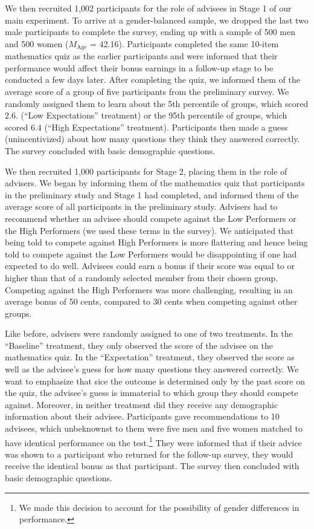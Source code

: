 \documentclass[
  man,
  floatsintext,
  longtable,
  nolmodern,
  notxfonts,
  notimes,
  colorlinks=true,linkcolor=blue,citecolor=blue,urlcolor=blue]{apa7}
\begin{document}
We then recruited 1,002 participants for the role of advisees in Stage 1
of our main experiment. To arrive at a gender-balanced sample, we
dropped the last two male participants to complete the survey, ending up
with a sample of 500 men and 500 women (\(M_{\text{Age}}\) = 42.16).
Participants completed the same 10-item mathematics quiz as the earlier
participants and were informed that their performance would affect their
bonus earnings in a follow-up stage to be conducted a few days later.
After completing the quiz, we informed them of the average score of a
group of five participants from the preliminary survey. We randomly
assigned them to learn about the 5th percentile of groups, which scored
2.6. (``Low Expectations'' treatment) or the 95th percentile of groups,
which scored 6.4 (``High Expectations'' treatment). Participants then
made a guess (unincentivized) about how many questions they think they
answered correctly. The survey concluded with basic demographic
questions.

We then recruited 1,000 participants for Stage 2, placing them in the
role of advisers. We began by informing them of the mathematics quiz
that participants in the preliminary study and Stage 1 had completed,
and informed them of the average score of all participants in the
preliminary study. Advisers had to recommend whether an advisee should
compete against the Low Performers or the High Performers (we used these
terms in the survey). We anticipated that being told to compete against
High Performers is more flattering and hence being told to compete
against the Low Performers would be disappointing if one had expected to
do well. Advisees could earn a bonus if their score was equal to or
higher than that of a randomly selected member from their chosen group.
Competing against the High Performers was more challenging, resulting in
an average bonus of 50 cents, compared to 30 cents when competing
against other groups.

Like before, advisers were randomly assigned to one of two treatments.
In the ``Baseline'' treatment, they only observed the score of the
advisee on the mathematics quiz. In the ``Expectation'' treatment, they
observed the score as well as the advisee's guess for how many questions
they answered correctly. We want to emphasize that sice the outcome is
determined only by the past score on the quiz, the advisee's guess is
immaterial to which group they should compete against. Moreover, in
neither treatment did they receive any demographic information about
their advisee. Participants gave recommendations to 10 advisees, which
unbeknownst to them were five men and five women matched to have
identical performance on the test.\footnote{We made this decision to
  account for the possibility of gender differences in performance.}
They were informed that if their advice was shown to a participant who
returned for the follow-up survey, they would receive the identical
bonus as that participant. The survey then concluded with basic
demographic questions.
\end{document}
